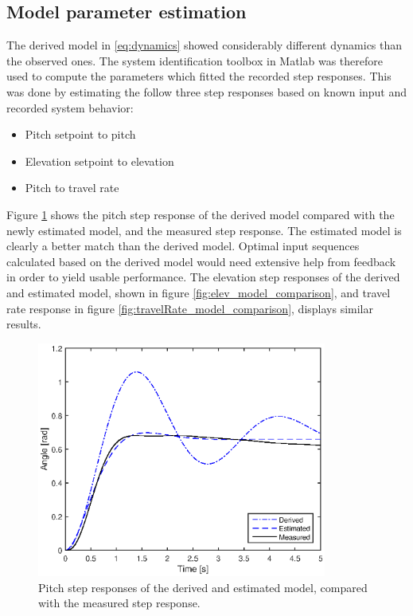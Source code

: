 \subsection{Model parameter estimation}
The derived model in \eqref{eq:dynamics} showed considerably different dynamics than the observed ones. The system identification toolbox in Matlab was therefore used to compute the parameters which fitted the recorded step responses. This was done by estimating the follow three step responses based on known input and recorded system behavior:

\begin{itemize}
	\item{Pitch setpoint to pitch}
	\item{Elevation setpoint to elevation}
	\item{Pitch to travel rate}
\end{itemize}

Figure \ref{fig:pitch_model_comparison} shows the pitch step response of the derived model compared with the newly estimated model, and the measured step response. The estimated model is clearly a better match than the derived model. Optimal input sequences calculated based on the derived model would need extensive help from feedback in order to yield usable performance. The elevation step responses of the derived and estimated model, shown in figure \ref{fig:elev_model_comparison}, and travel rate response in figure \ref{fig:travelRate_model_comparison}, displays similar results.

\begin{figure}[hp]
	\centering
		\includegraphics[width=0.85\textwidth]{figures/1/pitch_model_comparison.eps}
	\caption{Pitch step responses of the derived and estimated model, compared with the measured step response.}
	\label{fig:pitch_model_comparison}
\end{figure}

